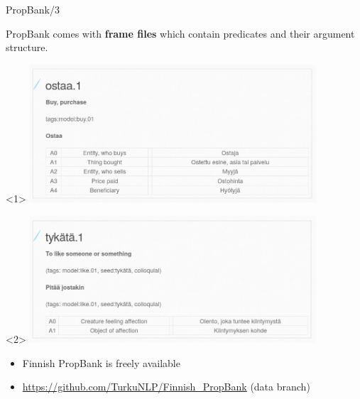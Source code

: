 \documentclass[10pt, compress]{beamer}
\begin{document}
\begin{frame}{PropBank/3}

PropBank comes with \textbf{frame files} which contain predicates and their argument structure.

\begin{center}
\begin{onlyenv}<1>
\includegraphics[width=0.8\textwidth]{graphics/finn-propbank.png}
\end{onlyenv}
\begin{onlyenv}<2>
\includegraphics[width=0.8\textwidth]{graphics/finn-propbank2.png}
\end{onlyenv}
\end{center}

\begin{itemize}
  \item Finnish PropBank is freely available
  \item \url{https://github.com/TurkuNLP/Finnish_PropBank} (data branch)
\end{itemize}
  
\end{frame}
\end{document}
